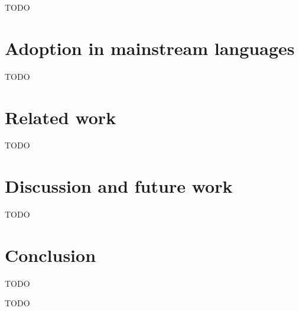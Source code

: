 \documentclass[acmsmall]{acmart}
\begin{document}
TODO %


\section{Adoption in mainstream languages} \label{sec:mainstream}


TODO %


\section{Related work} \label{sec:related}



TODO %


\section{Discussion and future work} \label{sec:discussion}


TODO %


\section{Conclusion} \label{sec:conclusion}

TODO %


\begin{acks}
    TODO %
\end{acks}



\end{document}
